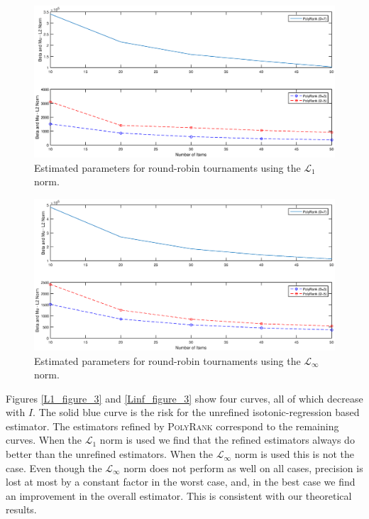 \documentclass[twoside,11pt]{article}
\begin{document}
\begin{figure}
  \centering
    \includegraphics[width=1\textwidth]{L1_figure_4}
    \caption{Estimated parameters for round-robin tournaments using the $\mathcal{L}_1$ norm. \label{L1_figure_4}}
\end{figure}

\begin{figure}
  \centering
    \includegraphics[width=1\textwidth]{Linf_figure_4}
    \caption{Estimated parameters for round-robin tournaments using the $\mathcal{L}_{\infty}$ norm. \label{Linf_figure_4}}
\end{figure}

Figures \ref{L1_figure_3} and \ref{Linf_figure_3} show four curves, all of which decrease with $I$. The solid blue curve is the risk for the unrefined isotonic-regression based estimator. The estimators refined by \textsc{PolyRank} correspond to the remaining curves. When the  $\mathcal{L}_1$ norm is used we find that the refined estimators always do better than the unrefined estimators. When the  $\mathcal{L}_{\infty}$ norm is used this is not the case. Even though the  $\mathcal{L}_{\infty}$ norm does not perform as well on all cases,  precision is lost at most by a constant factor in the worst case, and, in the best case we find an improvement in the overall estimator. This is consistent with our theoretical results.
\end{document}
